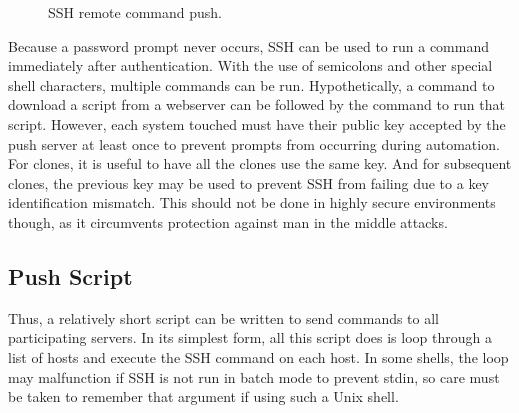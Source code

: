 \begin{figure}
  \begin{center}
  \end{center}
  \caption{SSH remote command push.}
  \label{fig:sshpush}
\end{figure}

Because a password prompt never occurs, SSH can be used to run a command immediately after authentication.  With the use of semicolons and other special shell characters, multiple commands can be run.  Hypothetically, a command to download a script from a webserver can be followed by the command to run that script.  However, each system touched must have their public key accepted by the push server at least once to prevent prompts from occurring during automation.  For clones, it is useful to have all the clones use the same key.  And for subsequent clones, the previous key may be used to prevent SSH from failing due to a key identification mismatch.  This should not be done in highly secure environments though, as it circumvents protection against man in the middle attacks.  

\subsection{Push Script}
Thus, a relatively short script can be written to send commands to all participating servers.  In its simplest form, all this script does is loop through a list of hosts and execute the SSH command on each host.  In some shells, the loop may malfunction if SSH is not run in batch mode to prevent stdin, so care must be taken to remember that argument if using such a Unix shell.  

